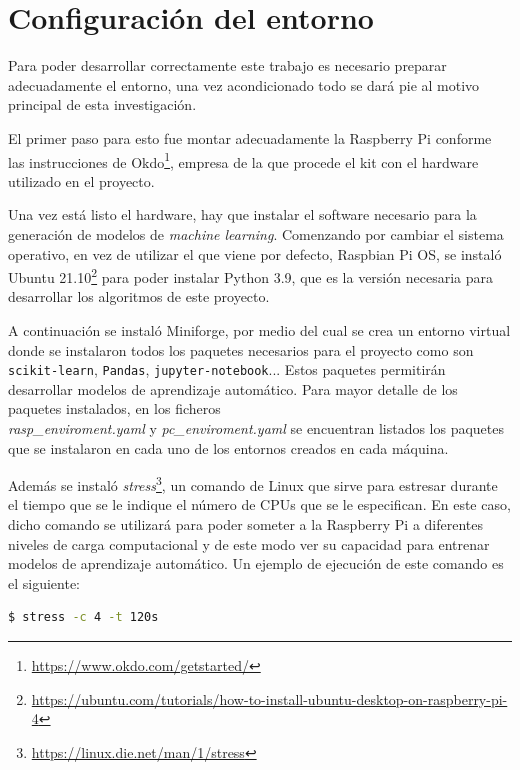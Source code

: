\documentclass[a4paper, 12pt]{book}
\begin{document}
\section{Configuración del entorno}
\label{sec:configuracion_entorno}

Para poder desarrollar correctamente este trabajo es necesario preparar adecuadamente el entorno, una vez acondicionado todo se dará pie al motivo principal de esta investigación.

El primer paso para esto fue montar adecuadamente la Raspberry Pi conforme las instrucciones de Okdo\footnote{\url{https://www.okdo.com/getstarted/}}, empresa de la que procede el kit con el hardware utilizado en el proyecto.

Una vez está listo el hardware, hay que instalar el software necesario para la generación de modelos de \textit{machine learning}.
Comenzando por cambiar el sistema operativo, en vez de utilizar el que viene por defecto, Raspbian Pi OS, se instaló Ubuntu 21.10\footnote{\url{https://ubuntu.com/tutorials/how-to-install-ubuntu-desktop-on-raspberry-pi-4}} para poder instalar Python 3.9, que es la versión necesaria para desarrollar los algoritmos de este proyecto.

A continuación se instaló Miniforge, por medio del cual se crea un entorno virtual donde se instalaron todos los paquetes necesarios para el proyecto como son \texttt{scikit-learn}, \texttt{Pandas}, \texttt{jupyter-notebook}... Estos paquetes permitirán desarrollar modelos de aprendizaje automático. Para mayor detalle de los paquetes instalados, en los ficheros \\\textit{rasp\_enviroment.yaml} y \textit{pc\_enviroment.yaml} se encuentran listados los paquetes que se instalaron en cada uno de los entornos creados en cada máquina.

Además se instaló \textit{stress}\footnote{\url{https://linux.die.net/man/1/stress}}, un comando de Linux que sirve para estresar durante el tiempo que se le indique el número de CPUs que se le especifican. En este caso, dicho comando se utilizará para poder someter a la Raspberry Pi a diferentes niveles de carga computacional y de este modo ver su capacidad para entrenar modelos de aprendizaje automático. Un ejemplo de ejecución de este comando es el siguiente:\\

\begin{lstlisting}[language=bash]
    $ stress -c 4 -t 120s
\end{lstlisting}
\end{document}
